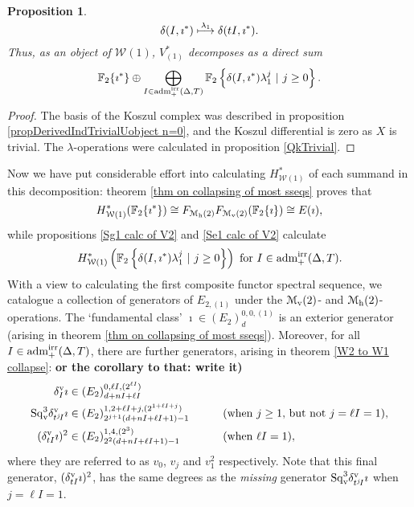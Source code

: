 \documentclass[11pt]{amsart}
\theoremstyle{plain}
\newtheorem{prop}[thm]{Proposition}
\theoremstyle{definition}
\newcommand{\calw}{\mathcal{W}}
\newcommand{\calmv}{\mathcal{M}_\textup{v}}
\newcommand{\calmh}{\mathcal{M}_\textup{h}}
\theoremstyle{plain}
\newcommand{\Sq}{\mathrm{Sq}}
\newcommand{\aDTirr}{\textup{adm}_+^\textup{irr}(\Delta,T)}
\newcommand{\F}{\mathbb{F}}
\newcommand{\Ftwo}{\F_2}
\begin{document}
\begin{Calculations of HW0}
\begin{prop}
\[\delta(I,\imath^*)\overset{\smash{\lambda_1}}{\longmapsto }\delta(tI,\imath^*).\]
Thus, as an object of $\calw(1)$, $V^*_{(1)}$ decomposes as a direct sum
\[\Ftwo \{\imath^*\}\oplus\bigoplus_{\smash{I\in \aDTirr}}\Ftwo \left\{\delta(I,\imath^*)\lambda_1^j\ |\ j\geq0\right\}.\]
\end{prop}
\begin{proof}
The basis of the Koszul complex was described in proposition \ref{propDerivedIndTrivialUobject n=0}, and the Koszul differential is zero as $X$ is trivial. The $\lambda$-operations were calculated in proposition \ref{QkTrivial}.
\end{proof}
Now we have put considerable effort into calculating $H^*_{\calw(1)}$ of each summand in this decomposition: theorem \ref{thm on collapsing of most sseqs} proves that
\[H^*_{\calw(1)}(\Ftwo \{\imath^*\})\cong F_{\calmh(2)}F_{\calmv(2)}(\Ftwo \{\imath\})\cong E(\imath),\]
while propositions \ref{Sg1 calc of V2} and \ref{Se1 calc of V2} calculate
\[H^*_{\calw(1)}\left(\Ftwo \left\{\delta(I,\imath^*)\lambda_1^j\ |\ j\geq0\right\}\right)\textup{ for $I\in\aDTirr$.}\]
With a view to calculating the first composite functor spectral sequence,
we catalogue a collection of generators of $E_{2,(1)}$ under the $\calmv(2)$- and $\calmh(2)$-operations. The `fundamental class' $\imath\in (E_2)^{0,0,(1)}_{d}$ is an exterior generator (arising in theorem  \ref{thm on collapsing of most sseqs}). %
Moreover, for all $I\in\aDTirr$, there are further generators, arising in theorem \ref{W2 to W1 collapse}: \textbf{or the corollary to that: write it)}
\begin{alignat*}{2}
\delta_I^{\textup{v}}\imath&\in (E_2)^{0,\ell I,(2^{\ell I})}_{d+nI+\ell I}&\qquad&\\
\Sq_{\textup{v}}^{3}\delta_{t^j\!I}^{\textup{v}}\imath&\in (E_2)^{1,2+\ell I+j,(2^{1+\ell I+j})}_{2^{j+1}(d+nI+\ell I+1)-1}&\qquad&\textup{(when $j\geq1$, but not $j=\ell I=1$),}\\
(\delta_{tI}^{\textup{v}}\imath)^{2}&\in (E_2)^{1,4,(2^{3})}_{2^{2}(d+nI+\ell I+1)-1}&\qquad&\textup{(when $\ell I=1$)},
\end{alignat*}
where they are referred to  as $v_0$, $v_j$ and $v_1^2$ respectively.
Note that this final generator, $(\delta_{tI}^{\textup{v}}\imath)^{2}$, has the same degrees as the \emph{missing} generator $\Sq_{\textup{v}}^{3}\delta_{t^j\!I}^{\textup{v}}\imath$ when $j=\ell I=1$.

\end{Calculations of HW0}
\end{document}
